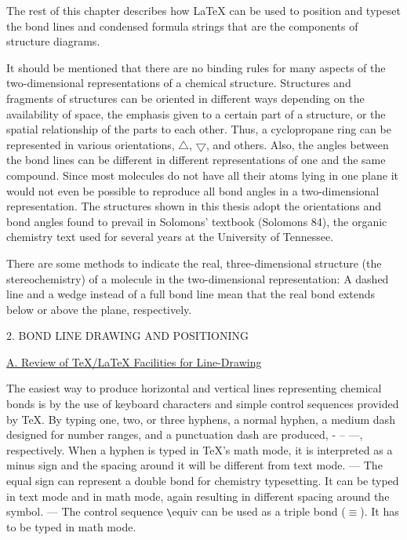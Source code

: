  The rest of this chapter describes how LaTeX can be used
 to position and typeset the bond lines and condensed
 formula strings that are the components of structure
 diagrams.

 It should be mentioned that there are no binding rules
 for many aspects of the two-dimensional representations
 of a chemical structure. Structures and fragments of
 structures can be oriented in different ways depending
 on the availability of space, the emphasis given to
 a certain part of a structure, or the spatial
 relationship of the parts to each other.
 Thus, a cyclopropane ring can be represented in various
 orientations, $\bigtriangleup $, $\bigtriangledown $,
 and others. Also, the angles between
 the bond lines can be different in different representations
 of one and the same compound. Since most molecules do not
 have all their atoms lying in one plane it would not 
 even be possible to reproduce all bond angles in a   
 two-dimensional representation. The structures shown in    
 this thesis adopt the orientations and bond angles
 found to prevail in Solomons' textbook (Solomons 84),
 the organic chemistry text used for several years at
 the University of Tennessee.
 
 There are some methods to indicate the real,
 three-dimensional structure (the stereochemistry)
 of a molecule in the two-dimensional representation:
 A dashed line and a wedge instead of a full bond
 line mean that the real bond extends below or
 above the plane, respectively. 
 
 \vspace{4mm}
 \centerline{2. BOND LINE DRAWING AND POSITIONING}
 \vspace{0.4cm}
 \begin{flushleft}
  \underline{A. Review of TeX/LaTeX Facilities for Line-Drawing}
 \end{flushleft}
 
 The easiest way to produce horizontal and vertical lines representing
 chemical bonds is by the use of keyboard characters and simple control
 sequences provided by TeX.  By typing one, two, or three hyphens,
 a normal hyphen, a medium dash designed for number ranges, and a
 punctuation dash are produced, - -- ---, respectively. When a hyphen
 is typed in TeX's math mode, it is interpreted as a minus sign and
 the spacing around it will be different from text mode. ---
 The equal sign can represent a double bond for chemistry typesetting.
 It can be typed in text mode and in math mode, again resulting in   
 different spacing around the symbol. --- The control sequence
 \verb+\+equiv can be used as a triple bond ($\equiv $). It has to
 be typed in math mode.
 
